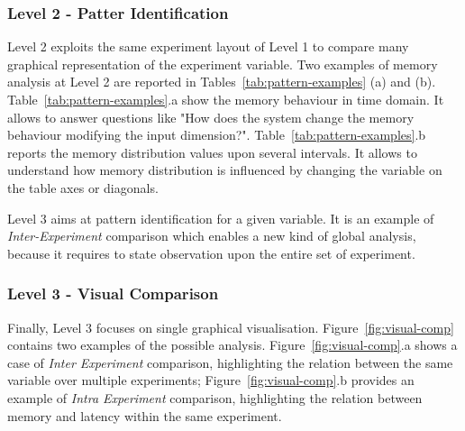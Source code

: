 \subsubsection{Level 2 - Patter Identification}\label{sec:impl-level2}

%  	



\noindent Level 2 exploits the same experiment layout of Level 1 to compare many graphical representation of the experiment variable. Two examples of memory analysis at Level 2 are reported in Tables~\ref{tab:pattern-examples} (a) and (b). Table~\ref{tab:pattern-examples}.a show the memory behaviour in time domain. It allows to answer questions like "How does the system change the memory behaviour modifying the input dimension?". Table~\ref{tab:pattern-examples}.b reports the memory distribution  values upon several intervals. It allows to understand how memory distribution is influenced by changing the variable on the table axes or diagonals.

Level 3 aims at pattern identification for a given variable. It is an example of \textit{Inter-Experiment} comparison which enables a new kind of global analysis, because it requires to state observation upon the entire set of experiment.

\subsubsection{Level 3 - Visual Comparison}\label{sec:impl-level3}

\noindent Finally, Level 3 focuses on single graphical visualisation. Figure~\ref{fig:visual-comp} contains two examples of the possible analysis. Figure~\ref{fig:visual-comp}.a shows a case of \textit{Inter Experiment} comparison, highlighting the relation between the same variable over multiple experiments; Figure~\ref{fig:visual-comp}.b provides an example of \textit{Intra Experiment} comparison, highlighting the relation between memory and latency within the same experiment.

